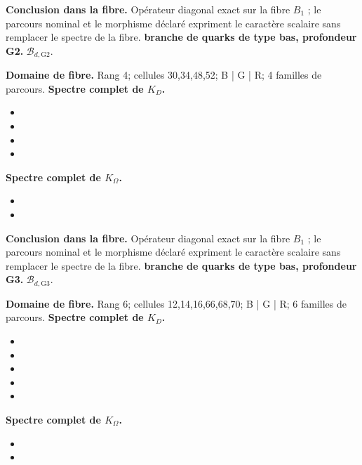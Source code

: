 \noindent\textbf{Conclusion dans la fibre.} Opérateur diagonal exact sur la fibre \(B_1\) ; le parcours nominal et le morphisme déclaré expriment le caractère scalaire sans remplacer le spectre de la fibre.
\medskip
{}
\noindent\textbf{branche de quarks de type bas, profondeur G2.} \(\mathcal B_{d,\mathrm{G2}}\).\par
\noindent\textbf{Domaine de fibre.} Rang 4; cellules 30,34,48,52; B | G | R; 4 familles de parcours.
\noindent\textbf{Spectre complet de \(K_D\).}
\begin{itemize}
\item \texttt{}
\item \texttt{}
\item \texttt{}
\item \texttt{}
\end{itemize}
\noindent\textbf{Spectre complet de \(K_\Omega\).}
\begin{itemize}
\item \texttt{}
\item \texttt{}
\end{itemize}
\noindent\textbf{Conclusion dans la fibre.} Opérateur diagonal exact sur la fibre \(B_1\) ; le parcours nominal et le morphisme déclaré expriment le caractère scalaire sans remplacer le spectre de la fibre.
\medskip
{}
\noindent\textbf{branche de quarks de type bas, profondeur G3.} \(\mathcal B_{d,\mathrm{G3}}\).\par
\noindent\textbf{Domaine de fibre.} Rang 6; cellules 12,14,16,66,68,70; B | G | R; 6 familles de parcours.
\noindent\textbf{Spectre complet de \(K_D\).}
\begin{itemize}
\item \texttt{}
\item \texttt{}
\item \texttt{}
\item \texttt{}
\item \texttt{}
\end{itemize}
\noindent\textbf{Spectre complet de \(K_\Omega\).}
\begin{itemize}
\item \texttt{}
\item \texttt{}
\end{itemize}
